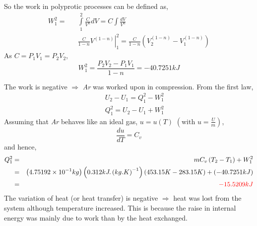 \begin{enumerate}
So the work in polyprotic processes can be defined as,
\begin{eqnarray}
W_{1}^{2} = && \int\limits_{1}^{2}\displaystyle\frac{C}{V^{n}}dV = C \int\displaystyle\frac{dV}{V^{n}} \nonumber \\
           && \left.\displaystyle\frac{C}{1-n} V^{(1-n)} \right|_{1}^{2} = \displaystyle\frac{C}{1-n}  \left( V_{2}^{(1-n)}-V_{1}^{(1-n)}\right) \nonumber
\end{eqnarray}
As $C = P_{1}V_{1} = P_{2}V_{2}$,
\begin{displaymath}
W_{1}^{2} = \displaystyle\frac{P_{2}V_{2}-P_{1}V_{1}}{1-n} = -40.7251 kJ
\end{displaymath}


The work is negative $\Longrightarrow$ {\it Ar} was worked upon in compression. From the first law,
\begin{eqnarray}
&& U_{2} - U_{1} = Q_{1}^{2} - W_{1}^{2} \nonumber \\
&& Q_{1}^{2} = U_{2} - U_{1} + W_{1}^{2} \nonumber 
\end{eqnarray}
Assuming that {\it Ar} behaves like an ideal gas, \ie $u=u(T)$ $\left(\text{with }u=\displaystyle\frac{U}{m}\right)$, 
\begin{displaymath}
\displaystyle\frac{du}{dT} = C_{v}
\end{displaymath}
and hence,
\begin{eqnarray}
Q_{1}^{2} &=& mC_{v}\left(T_{2} - T_{1}\right) + W_{1}^{2} \nonumber \\
         &=& \left( 4.75192\times 10^{-1} kg \right) \left( 0.312 kJ.\left(kg.K\right)^{-1} \right) \nonumber \left( 453.15 K - 283.15 K \right) + \left( -40.7251 kJ \right) \nonumber \\
         &=& \textcolor{red}{-15.5209 kJ} \nonumber
\end{eqnarray}
The variation of heat (or heat transfer) is negative $\Longrightarrow$ heat was lost from the system although temperature increased. This is because the raise in internal energy was mainly due to work than by the heat exchanged.   


\end{enumerate}

